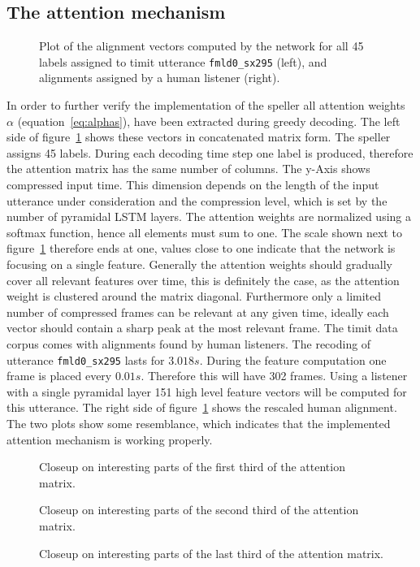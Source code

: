\subsection{The attention mechanism}
\begin{figure}
\centering


\caption{Plot of the alignment vectors computed by the network for all 45 labels assigned to timit utterance \texttt{fmld0\_sx295} (left), and alignments assigned by a human listener (right).}
\label{fig:fullAttention}
\end{figure}
In order to further verify the implementation of the speller all attention weights $\alpha$ (equation~\ref{eq:alphas}), have been extracted during greedy decoding. The left side of figure~\ref{fig:fullAttention} shows these vectors in concatenated matrix form. The speller assigns 45 labels. During each decoding time step one label is produced, therefore the attention matrix has the same number of columns. The y-Axis shows compressed input time. This dimension depends on the length of the input utterance under consideration and the compression level, which is set by the number of pyramidal LSTM layers. The attention weights are normalized using a softmax function, hence all elements must sum to one. The scale shown next to figure~\ref{fig:fullAttention} therefore ends at one, values close to one indicate that the network is focusing on a single feature. Generally the attention weights should gradually cover all relevant features over time, this is definitely the case, as the attention weight is clustered around the matrix diagonal. 
Furthermore only a limited number of compressed frames can be relevant at any given time, ideally each vector should contain a sharp peak at the most relevant frame.   
The timit data corpus comes with alignments found by human listeners. The recoding of utterance \texttt{fmld0\_sx295} lasts for $3.018s$. During the feature computation one frame is placed every $0.01s$. Therefore this will have 302 frames. Using a listener with a single pyramidal layer 151 high level feature vectors will be computed for this utterance. The right side of figure~\ref{fig:fullAttention} shows the rescaled human alignment. The two plots show some resemblance, which indicates that the implemented attention mechanism is working properly. 
\begin{figure}
\centering

\caption{Closeup on interesting parts of the first third of the attention matrix.}

\caption{Closeup on interesting parts of the second third of the attention matrix.}

\caption{Closeup on interesting parts of the last third of the attention matrix.}
\label{fig:attention3}
\end{figure}
